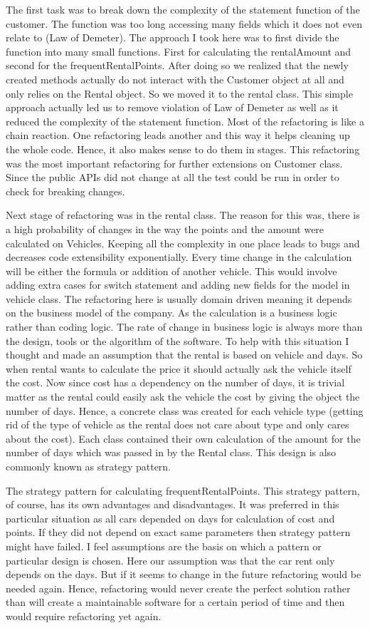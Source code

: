 The first task was to break down the complexity of the statement function of the customer. The function was too long accessing many fields which it does not even relate to (Law of Demeter). The approach I took here was to first divide the function into many small functions. First for calculating the rentalAmount and second for the frequentRentalPoints. After doing so we realized that the newly created methods actually do not interact with the Customer object at all and only relies on the Rental object. So we moved it to the rental class. This simple approach actually led us to remove violation of Law of Demeter as well as it reduced the complexity of the statement function. Most of the refactoring is like a chain reaction. One refactoring leads another and this way it helps cleaning up the whole code. Hence, it also makes sense to do them in stages. This refactoring was the most important refactoring for further extensions on Customer class. Since the public APIs did not change at all the test could be run in order to check for breaking changes.

Next stage of refactoring was in the rental class. The reason for this was, there is a high probability of changes in the way the points and the amount were calculated on Vehicles. Keeping all the complexity in one place leads to bugs and decreases code extensibility exponentially. Every time change in the calculation will be either the formula or addition of another vehicle. This would involve adding extra cases for switch statement and adding new fields for the model in vehicle class. The refactoring here is usually domain driven meaning it depends on the business model of the company. As the calculation is a business logic rather than coding logic. The rate of change in business logic is always more than the design, tools or the algorithm of the software. To help with this situation I thought and made an assumption that the rental is based on vehicle and days. So when rental wants to calculate the price it should actually ask the vehicle itself the cost. Now since cost has a dependency on the number of days, it is trivial matter as the rental could easily ask the vehicle the cost by giving the object the number of days. Hence, a concrete class was created for each vehicle type (getting rid of the type of vehicle as the rental does not care about type and only cares about the cost). Each class contained their own calculation of the amount for the number of days which was passed in by the Rental class. This design is also commonly known as strategy pattern.

The strategy pattern for calculating frequentRentalPoints. This strategy pattern, of course, has its own advantages and disadvantages. It was preferred in this particular situation as all cars depended on days for calculation of cost and points. If they did not depend on exact same parameters then strategy pattern might have failed. I feel assumptions are the basis on which a pattern or particular design is chosen. Here our assumption was that the car rent only depends on the days. But if it seems to change in the future refactoring would be needed again. Hence, refactoring would never create the perfect solution rather than will create a maintainable software for a certain period of time and then would require refactoring yet again.
